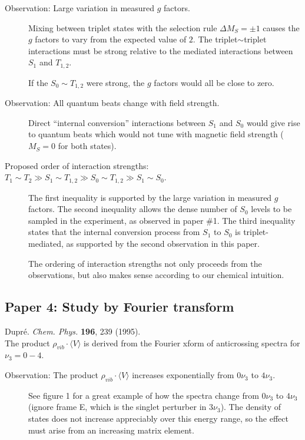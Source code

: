 \documentclass[12pt]{mitthesis}
\begin{document}
\begin{description}
\item[Observation: Large variation in measured $g$ factors.]
  Mixing between triplet states with the selection rule $\Delta M_S =
  \pm 1$ causes the $g$ factors to vary from the expected value of
  $2$.  The triplet$\sim$triplet interactions must be strong relative
  to the mediated interactions between $S_1$ and $T_{1,2}$.

  If the $S_0 \sim T_{1,2}$ were strong, the $g$ factors would all be
  close to zero.

\item[Observation: All quantum beats change with field strength.]
  Direct ``internal conversion'' interactions between $S_1$ and $S_0$
  would give rise to quantum beats which would not tune with magnetic
  field strength ($M_S=0$ for both states).

\item[Proposed order of interaction strengths: $T_1 \sim T_2 \gg S_1
  \sim T_{1,2} \gg S_0 \sim T_{1,2} \gg S_1 \sim S_0$.] The first
  inequality is supported by the large variation in measured $g$
  factors.  The second inequality allows the dense number of $S_0$
  levels to be sampled in the experiment, as observed in paper \#1.
  The third inequality states that the internal conversion process
  from $S_1$ to $S_0$ is triplet-mediated, as supported by the second
  observation in this paper.

  The ordering of interaction strengths not only proceeds from the
  observations, but also makes sense according to our chemical
  intuition.
\end{description}

\subsection{Paper 4: Study by Fourier transform}

Dupr\'{e}. \emph{Chem. Phys.} \textbf{196}, 239 (1995).\\
The product $\rho_{vib} \cdot \langle V \rangle$ is derived from the
Fourier xform of anticrossing spectra for $\nu_3=0-4$.

\begin{description}
\item[Observation: The product $\rho_{vib} \cdot \langle V \rangle$
  increases exponentially from $0\nu_3$ to $4\nu_3$.]  See figure 1
  for a great example of how the spectra change from $0\nu_3$ to
  $4\nu_3$ (ignore frame E, which is the singlet perturber in
  $3\nu_3$).  The density of states does not increase appreciably over
  this energy range, so the effect must arise from an increasing
  matrix element.
\end{description}
\end{document}

